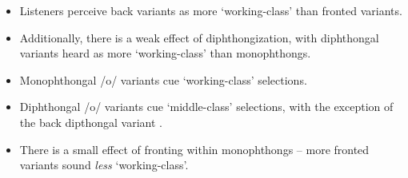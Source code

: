\documentclass[a0,portrait]{a0poster}
\begin{document}
\begin{multicols}{4}
\begin{itemize}
\item{Listeners perceive back  variants as more `working-class' than fronted variants.}
\item{Additionally, there is a weak effect of  diphthongization, with diphthongal variants heard as more `working-class' than monophthongs.}
\item{Monophthongal /o/ variants cue `working-class' selections.}
\item{Diphthongal /o/ variants cue `middle-class' selections, with the exception of the back dipthongal variant \textipa{[oU]}.}
\item{There is a small effect of fronting within monophthongs -- more fronted variants sound \textit{less} `working-class'.}
\end{itemize}
\justify
\vspace*{-1cm}

\end{multicols}
\end{document}
